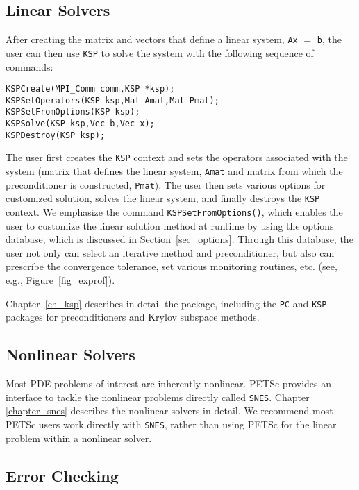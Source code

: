{{\subsection*{Linear Solvers}

After creating the matrix and vectors that define a linear system,
\lstinline{Ax} $=$ \lstinline{b}, the user can then use \lstinline{KSP} to solve the system
with the following sequence of commands:
\begin{lstlisting}
KSPCreate(MPI_Comm comm,KSP *ksp); 
KSPSetOperators(KSP ksp,Mat Amat,Mat Pmat);
KSPSetFromOptions(KSP ksp);
KSPSolve(KSP ksp,Vec b,Vec x);
KSPDestroy(KSP ksp);
\end{lstlisting}
The user first creates the \lstinline{KSP} context and sets the operators
associated with the system (matrix that defines the linear system, \lstinline{Amat} and matrix from which the 
preconditioner is constructed, \lstinline{Pmat}).  The user then sets various options for
customized solution, solves the linear system, and finally destroys
the \lstinline{KSP} context.  We emphasize the command \lstinline{KSPSetFromOptions()},
which enables the user to customize the linear solution
method at runtime by using the options database, which is discussed in
Section~\ref{sec_options}. Through this database, the user not only
can select an iterative method and preconditioner, but also can prescribe
the convergence tolerance, set various monitoring routines, etc.
(see, e.g., Figure~\ref{fig_exprof}).

Chapter~\ref{ch_ksp} describes in detail the  package, including
the \lstinline{PC} and \lstinline{KSP} packages for preconditioners and Krylov subspace methods.

\subsection*{Nonlinear Solvers}
Most PDE problems of interest are inherently nonlinear. PETSc provides
an interface to tackle the nonlinear problems directly called \lstinline{SNES}. Chapter
\ref{chapter_snes} describes the nonlinear solvers in detail. We recommend
most PETSc users work directly with \lstinline{SNES}, rather than using PETSc
for the linear problem within a nonlinear solver.

\subsection*{Error Checking}

}}
